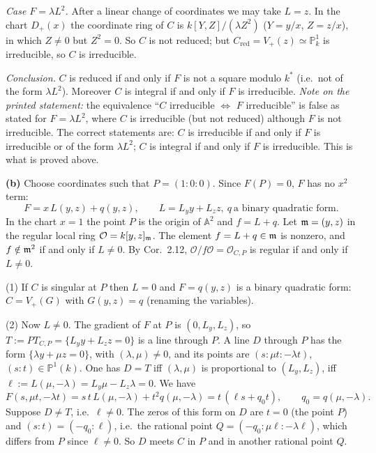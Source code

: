 \documentclass[11pt]{article}
\begin{document}
\emph{Case $F=\lambda L^2$.} After a linear change of coordinates we may take $L=z$. In the chart $D_+(x)$ the coordinate ring of $C$ is $k[Y,Z]/(\lambda Z^2)$ ($Y=y/x$, $Z=z/x$), in which $Z\neq0$ but $Z^2=0$. So $C$ is not reduced; but $C_{\operatorname{red}}=V_+(z)\simeq\mathbb P^1_k$ is irreducible, so $C$ is irreducible.

\emph{Conclusion.} $C$ is reduced if and only if $F$ is not a square modulo $k^*$ (i.e.\ not of the form $\lambda L^2$). Moreover $C$ is integral if and only if $F$ is irreducible. \emph{Note on the printed statement:} the equivalence ``$C$ irreducible $\iff$ $F$ irreducible'' is false as stated for $F=\lambda L^2$, where $C$ is irreducible (but not reduced) although $F$ is not irreducible. The correct statements are: $C$ is irreducible if and only if $F$ is irreducible or of the form $\lambda L^2$; $C$ is integral if and only if $F$ is irreducible. This is what is proved above.

\textbf{(b)} Choose coordinates such that $P=(1:0:0)$. Since $F(P)=0$, $F$ has no $x^2$ term:
\[ F=x\,L(y,z)+q(y,z),\qquad L=L_yy+L_zz,\ q\ \text{a binary quadratic form}. \]
In the chart $x=1$ the point $P$ is the origin of $\mathbb A^2$ and $f=L+q$. Let $\mathfrak m=(y,z)$ in the regular local ring $\mathcal O=k[y,z]_\mathfrak m$. The element $f=L+q\in\mathfrak m$ is nonzero, and $f\notin\mathfrak m^2$ if and only if $L\neq0$. By Cor.~2.12, $\mathcal O/f\mathcal O=\mathcal O_{C,P}$ is regular if and only if $L\neq0$.

(1) If $C$ is singular at $P$ then $L=0$ and $F=q(y,z)$ is a binary quadratic form: $C=V_+(G)$ with $G(y,z)=q$ (renaming the variables).

(2) Now $L\neq0$. The gradient of $F$ at $P$ is $(0,L_y,L_z)$, so $T:=PT_{C,P}=\{L_yy+L_zz=0\}$ is a line through $P$. A line $D$ through $P$ has the form $\{\lambda y+\mu z=0\}$, with $(\lambda,\mu)\neq0$, and its points are $(s:\mu t:-\lambda t)$, $(s:t)\in\mathbb P^1(k)$. One has $D=T$ iff $(\lambda,\mu)$ is proportional to $(L_y,L_z)$, iff $\ell:=L(\mu,-\lambda)=L_y\mu-L_z\lambda=0$. We have
\[ F(s,\mu t,-\lambda t)=s\,t\,L(\mu,-\lambda)+t^2q(\mu,-\lambda)=t\,(\ell s+q_0t),\qquad q_0=q(\mu,-\lambda). \]
Suppose $D\neq T$, i.e.\ $\ell\neq0$. The zeros of this form on $D$ are $t=0$ (the point $P$) and $(s:t)=(-q_0:\ell)$, i.e.\ the rational point $Q=(-q_0:\mu\ell:-\lambda\ell)$, which differs from $P$ since $\ell\neq0$. So $D$ meets $C$ in $P$ and in another rational point $Q$.
\end{document}
